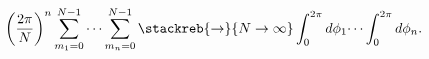 \begin{equation}
\left(\frac{2\pi}{N}\right)^n\sum_{m_1=0}^{N-1} \dots \sum_{m_n=0}^{N-1}
\stackreb{\to}{N\to\infty} \int_{0}^{2\pi}d\phi_1 \dots
\int_{0}^{2\pi}d\phi_n.
\label{sum}\end{equation}

